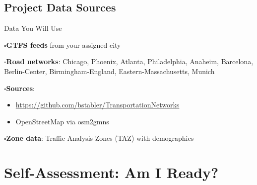 \documentclass[11pt,letterpaper]{article}
\newcommand{\cmark}{$\square$\hspace{0.3em}}
\begin{document}
\subsection*{Project Data Sources}

\begin{questionbox}{Data You Will Use}

\cmark \textbf{GTFS feeds} from your assigned city

\cmark \textbf{Road networks}: Chicago, Phoenix, Atlanta, Philadelphia, Anaheim, Barcelona, Berlin-Center, Birmingham-England, Eastern-Massachusetts, Munich

\cmark \textbf{Sources}: 
\begin{itemize}[nosep]
    \item \url{https://github.com/bstabler/TransportationNetworks}
    \item OpenStreetMap via osm2gmns
\end{itemize}

\cmark \textbf{Zone data}: Traffic Analysis Zones (TAZ) with demographics

\end{questionbox}

\section{Self-Assessment: Am I Ready?}
\end{document}
